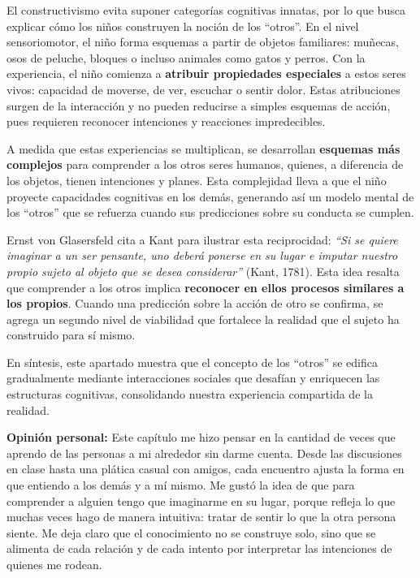 \documentclass{article}
\begin{document}
El constructivismo evita suponer categorías cognitivas innatas, por lo que busca explicar cómo los niños construyen la noción de los “otros”. En el nivel sensoriomotor, el niño forma esquemas a partir de objetos familiares: muñecas, osos de peluche, bloques o incluso animales como gatos y perros. Con la experiencia, el niño comienza a \textbf{atribuir propiedades especiales} a estos seres vivos: capacidad de moverse, de ver, escuchar o sentir dolor. Estas atribuciones surgen de la interacción y no pueden reducirse a simples esquemas de acción, pues requieren reconocer intenciones y reacciones impredecibles.

A medida que estas experiencias se multiplican, se desarrollan \textbf{esquemas más complejos} para comprender a los otros seres humanos, quienes, a diferencia de los objetos, tienen intenciones y planes. Esta complejidad lleva a que el niño proyecte capacidades cognitivas en los demás, generando así un modelo mental de los “otros” que se refuerza cuando sus predicciones sobre su conducta se cumplen.

Ernst von Glasersfeld cita a Kant para ilustrar esta reciprocidad: \emph{“Si se quiere imaginar a un ser pensante, uno deberá ponerse en su lugar e imputar nuestro propio sujeto al objeto que se desea considerar”} (Kant, 1781). Esta idea resalta que comprender a los otros implica \textbf{reconocer en ellos procesos similares a los propios}. Cuando una predicción sobre la acción de otro se confirma, se agrega un segundo nivel de viabilidad que fortalece la realidad que el sujeto ha construido para sí mismo.

En síntesis, este apartado muestra que el concepto de los “otros” se edifica gradualmente mediante interacciones sociales que desafían y enriquecen las estructuras cognitivas, consolidando nuestra experiencia compartida de la realidad.

\textbf{Opinión personal:}  
Este capítulo me hizo pensar en la cantidad de veces que aprendo de las personas a mi alrededor sin darme cuenta. Desde las discusiones en clase hasta una plática casual con amigos, cada encuentro ajusta la forma en que entiendo a los demás y a mí mismo. Me gustó la idea de que para comprender a alguien tengo que imaginarme en su lugar, porque refleja lo que muchas veces hago de manera intuitiva: tratar de sentir lo que la otra persona siente. Me deja claro que el conocimiento no se construye solo, sino que se alimenta de cada relación y de cada intento por interpretar las intenciones de quienes me rodean.
\end{document}
